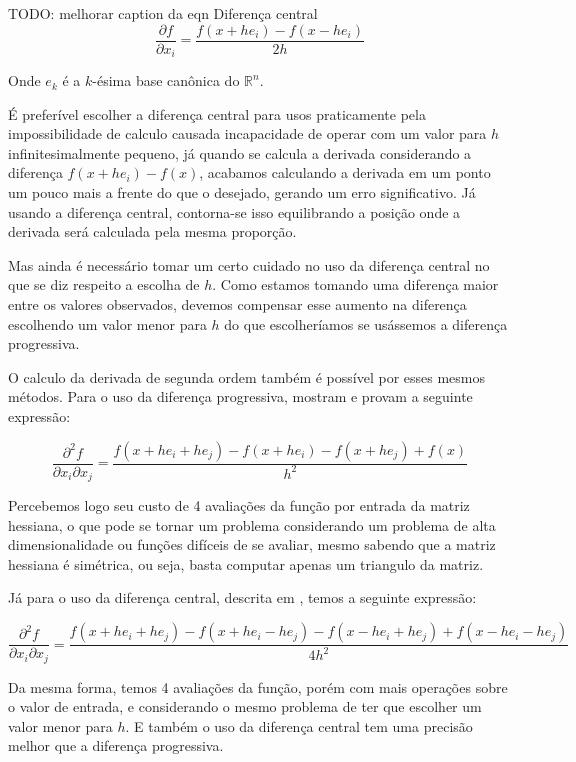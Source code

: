 TODO: melhorar caption da eqn Diferença central
\begin{equation*}
\frac{\partial f}{\partial x_i} = \frac{f(x+he_i) - f(x - he_i)}{2h}
\end{equation*}

Onde \(e_k\) é a \(k\)-ésima base canônica do \(\mathbb{R}^n\).

É preferível escolher a diferença central para usos praticamente pela impossibilidade de
calculo causada incapacidade de operar com um valor para \(h\) infinitesimalmente pequeno, já
quando se calcula a derivada considerando a diferença \(f(x+he_i) - f(x)\), acabamos
calculando a derivada em um ponto um pouco mais a frente do que o desejado, gerando um erro
significativo. Já usando a diferença central, contorna-se isso equilibrando a posição onde a
derivada será calculada pela mesma proporção.

Mas ainda é necessário tomar um certo cuidado no uso da diferença central no que se diz
respeito a escolha de \(h\). Como estamos tomando uma diferença maior entre os valores
observados, devemos compensar esse aumento na diferença escolhendo um valor menor para \(h\)
do que escolheríamos se usássemos a diferença progressiva.


O calculo da derivada de segunda ordem também é possível por esses mesmos métodos.
Para o uso da diferença progressiva, \cite{dennisschnabel1996} mostram e provam a seguinte
expressão:

\begin{equation*}
\frac{\partial^2 f}{\partial x_i \partial x_j} = \frac{f(x+he_i + he_j) - f(x+he_i) - f(x+he_j) + f(x)}{h^2}
\end{equation*}

Percebemos logo seu custo de 4 avaliações da função por entrada da matriz hessiana, o que pode
se tornar um problema considerando um problema de alta dimensionalidade ou funções difíceis de
se avaliar, mesmo sabendo que a matriz hessiana é simétrica, ou seja, basta computar apenas um
triangulo da matriz.

Já para o uso da diferença central, descrita em \cite{abramowitz1972handbook}, temos a seguinte
expressão:

\begin{equation*}
\frac{\partial^2 f}{\partial x_i \partial x_j} = \frac{f(x + he_i + he_j) - f(x + he_i - he_j) - f(x -he_i + he_j) + f(x - he_i -he_j )}{4h^2}
\end{equation*}

Da mesma forma, temos 4 avaliações da função, porém com mais operações sobre o valor de entrada,
e considerando o mesmo problema de ter que escolher um valor menor para \(h\). E também o uso da
diferença central tem uma precisão melhor que a diferença progressiva.

